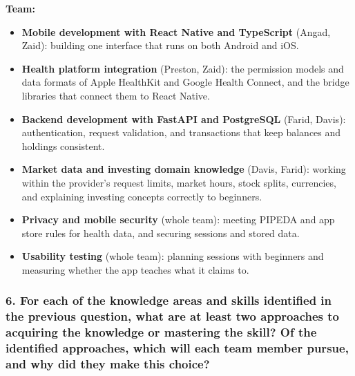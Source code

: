 \documentclass[12pt]{article}
\begin{document}
\textbf{Team:}
\begin{itemize}
  \item \textbf{Mobile development with React Native and TypeScript} (Angad,
  Zaid): building one interface that runs on both Android and iOS.
  \item \textbf{Health platform integration} (Preston, Zaid): the permission
  models and data formats of Apple HealthKit and Google Health Connect, and the
  bridge libraries that connect them to React Native.
  \item \textbf{Backend development with FastAPI and PostgreSQL} (Farid,
  Davis): authentication, request validation, and transactions that keep
  balances and holdings consistent.
  \item \textbf{Market data and investing domain knowledge} (Davis, Farid):
  working within the provider's request limits, market hours, stock splits,
  currencies, and explaining investing concepts correctly to beginners.
  \item \textbf{Privacy and mobile security} (whole team): meeting PIPEDA and
  app store rules for health data, and securing sessions and stored data.
  \item \textbf{Usability testing} (whole team): planning sessions with
  beginners and measuring whether the app teaches what it claims to.
\end{itemize}

\subsubsection*{6. For each of the knowledge areas and skills identified in the
previous question, what are at least two approaches to acquiring the knowledge
or mastering the skill? Of the identified approaches, which will each team
member pursue, and why did they make this choice?}
\end{document}
